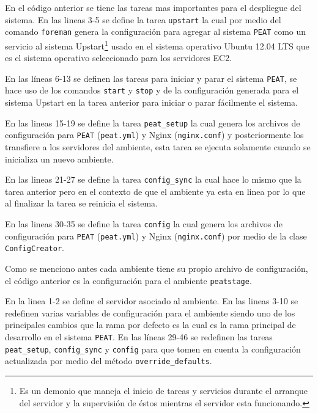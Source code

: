 

En el código anterior se tiene las tareas mas importantes para el
despliegue del sistema. En las lineas 3-5 se define la tarea \texttt{upstart}
la cual por medio del comando \texttt{foreman} genera la configuración para agregar
al sistema \texttt{PEAT} como un servicio al sistema Upstart\footnote{Es un demonio
  que maneja el inicio de tareas y servicios durante el arranque del servidor y la
  supervisión de éstos mientras el servidor esta funcionando.} usado en el sistema
operativo Ubuntu 12.04 LTS que es el sistema operativo seleccionado para los
servidores EC2.

En las líneas 6-13 se definen las tareas para iniciar y parar el sistema
\texttt{PEAT}, se hace uso de los comandos \texttt{start} y \texttt{stop} y
de la configuración generada para el sistema Upstart en la tarea anterior para
iniciar o parar fácilmente el sistema.

En las lineas 15-19 se define la tarea \texttt{peat\_setup} la cual genera
los archivos de configuración para \texttt{PEAT} (\texttt{peat.yml}) y
Nginx (\texttt{nginx.conf}) y posteriormente los transfiere a los servidores
del ambiente, esta tarea se ejecuta solamente cuando se inicializa un nuevo
ambiente.

En las lineas 21-27 se define la tarea \texttt{config\_sync} la cual
hace lo mismo que la tarea anterior pero en el contexto de que el ambiente
ya esta en linea por lo que al finalizar la tarea se reinicia el sistema.

En las lineas 30-35 se define la tarea \texttt{config} la cual genera
los archivos de configuración para \texttt{PEAT} (\texttt{peat.yml}) y
Nginx (\texttt{nginx.conf}) por medio de la clase \texttt{ConfigCreator}.



Como se menciono antes cada ambiente tiene su propio archivo de configuración,
el código anterior es la configuración para el ambiente \texttt{peatstage}.

En la linea 1-2 se define el servidor asociado al ambiente. En las lineas
3-10 se redefinen varias variables de configuración para el ambiente siendo uno
de los principales cambios que la rama por defecto es  la
cual es la rama principal de desarrollo en el sistema \texttt{PEAT}.
En las líneas 29-46 se redefinen las tareas \texttt{peat\_setup},
\texttt{config\_sync} y \texttt{config} para que tomen en cuenta la configuración
actualizada por medio del método \texttt{override\_defaults}.

